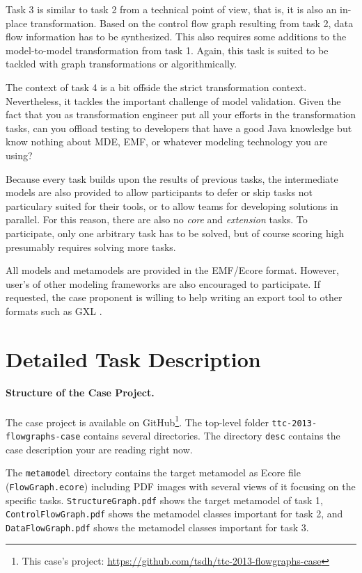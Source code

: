 \documentclass[11pt]{article}
\begin{document}
Task 3 is similar to task 2 from a technical point of view, that is, it is also
an in-place transformation.  Based on the control flow graph resulting from
task 2, data flow information has to be synthesized.  This also requires some
additions to the model-to-model transformation from task 1.  Again, this task
is suited to be tackled with graph transformations or algorithmically.

The context of task 4 is a bit offside the strict transformation context.
Nevertheless, it tackles the important challenge of model validation.  Given
the fact that you as transformation engineer put all your efforts in the
transformation tasks, can you offload testing to developers that have a good
Java knowledge but know nothing about MDE, EMF, or whatever modeling technology
you are using?

Because every task builds upon the results of previous tasks, the intermediate
models are also provided to allow participants to defer or skip tasks not
particulary suited for their tools, or to allow teams for developing solutions
in parallel.  For this reason, there are also no \emph{core} and
\emph{extension} tasks.  To participate, only one arbitrary task has to be
solved, but of course scoring high presumably requires solving more tasks.


All models and metamodels are provided in the EMF/Ecore format.  However,
user's of other modeling frameworks are also encouraged to participate.  If
requested, the case proponent is willing to help writing an export tool to
other formats such as GXL \cite{GXL02}.


\section{Detailed Task Description}
\label{sec:task-descr}

\paragraph{Structure of the Case Project.}

The case project is available on GitHub\footnote{This case's project:
  \url{https://github.com/tsdh/ttc-2013-flowgraphs-case}}. The top-level folder
\verb|ttc-2013-flowgraphs-case| contains several directories.  The directory
\verb|desc| contains the case description your are reading right now.

The \verb|metamodel| directory contains the target metamodel as Ecore file
(\verb|FlowGraph.ecore|) including PDF images with several views of it focusing
on the specific tasks.  \verb|StructureGraph.pdf| shows the target metamodel of
task 1, \verb|ControlFlowGraph.pdf| shows the metamodel classes important for
task 2, and \verb|DataFlowGraph.pdf| shows the metamodel classes important for
task 3.
\end{document}
